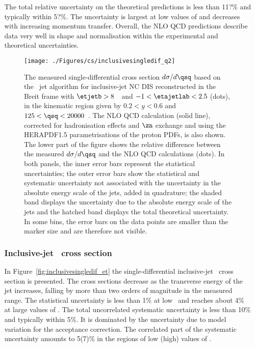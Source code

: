 The total relative uncertainty on the theoretical predictions is less than 11?\% and typically within 5?\%. The uncertainty is largest at low values of \qsq and decreases with increasing momentum transfer. Overall, the NLO QCD predictions describe data very well in shape and normalisation within the experimental and theoretical uncertainties.
\begin{figure}[p]
	\centering
		\texttt{[image: ./Figures/cs/inclusivesingledif\_q2]}
	\caption{The measured single-differential cross section $d\sigma/d\qsq$ based on the \kt~jet algorithm for inclusive-jet NC DIS reconstructed in the Breit frame with $\etjetb > 8$~\GeV~and $-1<\etajetlab<2.5$ (dots), in the kinematic region given by $0.2<y<0.6$ and $125 < \qsq < 20000$~\GeV. The NLO QCD calculation (solid line), corrected for hadronisation effects and $\zn$ exchange and using the HERAPDF1.5 parametrisations of the proton PDFs, is also shown. The lower part of the figure shows the relative difference between the measured $d\sigma/d\qsq$ and the NLO QCD calculations (dots). In both panels, the inner error bars represent the statistical uncertainties; the outer error bars show the statistical and systematic uncertainty not associated with the uncertainty in the absolute energy scale of the jets, added in quadrature; the shaded band displays the uncertainty due to the absolute energy scale of the jets and the hatched band displays the total theoretical uncertainty. In some bins, the error bars on the data points are smaller than the marker size and are therefore not visible.} 
	\label{fig:inclusivesingledif_q2}
\end{figure}

\subsubsection*{Inclusive-jet \dsdetjetb~cross section}
In Figure~\ref{fig:inclusivesingledif_et} the single-differential inclusive-jet \dsdetjetb~cross section is presented. The cross sections decrease as the transverse energy of the jet increases, falling by more than two orders of magnitude in the measured range. The statistical uncertainty is less than 1\% at low \etjetb~and reaches about 4\% at large values of \etjetb. The total uncorrelated systematic uncertainty is less than 10\% and typically within 5\%. It is dominated by the uncertainty due to model variation for the acceptance correction. The correlated part of the systematic uncertainty amounts to 5(7)\%  in the regions of low (high) values of \etjetb.

